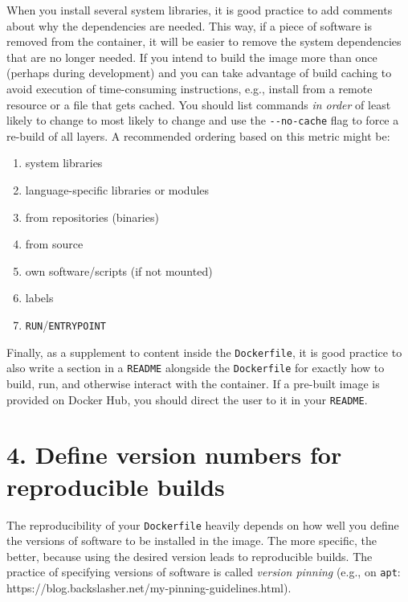 \documentclass[10pt,letterpaper]{article}
\providecommand{\tightlist}{%
  \setlength{\itemsep}{0pt}\setlength{\parskip}{0pt}}
\begin{document}
When you install several system libraries, it is good practice to add
comments about why the dependencies are needed. This way, if a piece of
software is removed from the container, it will be easier to remove the
system dependencies that are no longer needed. If you intend to build
the image more than once (perhaps during development) and you can take
advantage of build caching to avoid execution of time-consuming
instructions, e.g., install from a remote resource or a file that gets
cached. You should list commands \emph{in order} of least likely to
change to most likely to change and use the \texttt{-\/-no-cache} flag
to force a re-build of all layers. A recommended ordering based on this
metric might be:

\begin{enumerate}
\def\labelenumi{\arabic{enumi}.}
\tightlist
\item
  system libraries
\item
  language-specific libraries or modules
\item
  from repositories (binaries)
\item
  from source
\item
  own software/scripts (if not mounted)
\item
  labels
\item
  \texttt{RUN}/\texttt{ENTRYPOINT}
\end{enumerate}

Finally, as a supplement to content inside the \texttt{Dockerfile}, it
is good practice to also write a section in a \texttt{README} alongside
the \texttt{Dockerfile} for exactly how to build, run, and otherwise
interact with the container. If a pre-built image is provided on Docker
Hub, you should direct the user to it in your \texttt{README}.

\hypertarget{define-version-numbers-for-reproducible-builds}{%
\section*{4. Define version numbers for reproducible
builds}\label{define-version-numbers-for-reproducible-builds}}

  \label{rule:pinning} 

The reproducibility of your \texttt{Dockerfile} heavily depends on how
well you define the versions of software to be installed in the image.
The more specific, the better, because using the desired version leads
to reproducible builds. The practice of specifying versions of software
is called \emph{version pinning} (e.g., on \texttt{apt}:
https://blog.backslasher.net/my-pinning-guidelines.html).
\end{document}
